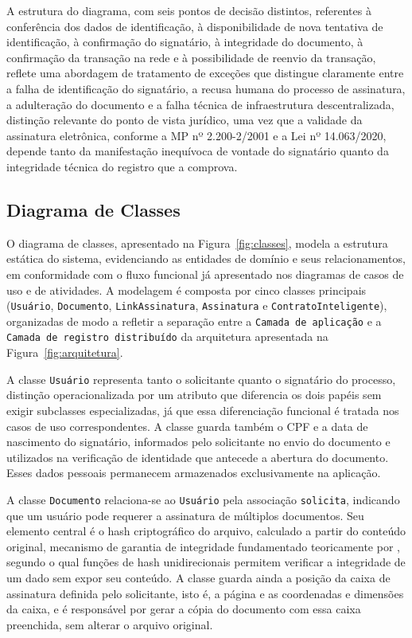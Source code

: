 \documentclass[
    12pt,
    a4paper,
    oneside,
    chapter=TITLE,
    section=TITLE,
    subsection=TITLE,
    subsubsection=TITLE,
    sumario=tradicional,
    english,
    brazil
]{abntex2}
\newcommand{\elem}[1]{\texttt{#1}}
\begin{document}
A estrutura do diagrama, com seis pontos de decisão distintos, referentes à conferência dos dados de identificação, à disponibilidade de nova tentativa de identificação, à confirmação do signatário, à integridade do documento, à confirmação da transação na rede e à possibilidade de reenvio da transação, reflete uma abordagem de tratamento de exceções que distingue claramente entre a falha de identificação do signatário, a recusa humana do processo de assinatura, a adulteração do documento e a falha técnica de infraestrutura descentralizada, distinção relevante do ponto de vista jurídico, uma vez que a validade da assinatura eletrônica, conforme a MP nº 2.200-2/2001 e a Lei nº 14.063/2020, depende tanto da manifestação inequívoca de vontade do signatário quanto da integridade técnica do registro que a comprova.

\subsection{Diagrama de Classes}
\label{sec:classes}

O diagrama de classes, apresentado na Figura~\ref{fig:classes}, modela a estrutura estática do sistema, evidenciando as entidades de domínio e seus relacionamentos, em conformidade com o fluxo funcional já apresentado nos diagramas de casos de uso e de atividades. A modelagem é composta por cinco classes principais (\elem{Usuário}, \elem{Documento}, \elem{LinkAssinatura}, \elem{Assinatura} e \elem{ContratoInteligente}), organizadas de modo a refletir a separação entre a \elem{Camada de aplicação} e a \elem{Camada de registro distribuído} da arquitetura apresentada na Figura~\ref{fig:arquitetura}.

A classe \elem{Usuário} representa tanto o solicitante quanto o signatário do processo, distinção operacionalizada por um atributo que diferencia os dois papéis sem exigir subclasses especializadas, já que essa diferenciação funcional é tratada nos casos de uso correspondentes. A classe guarda também o CPF e a data de nascimento do signatário, informados pelo solicitante no envio do documento e utilizados na verificação de identidade que antecede a abertura do documento. Esses dados pessoais permanecem armazenados exclusivamente na aplicação.

A classe \elem{Documento} relaciona-se ao \elem{Usuário} pela associação \elem{solicita}, indicando que um usuário pode requerer a assinatura de múltiplos documentos. Seu elemento central é o hash criptográfico do arquivo, calculado a partir do conteúdo original, mecanismo de garantia de integridade fundamentado teoricamente por , segundo o qual funções de hash unidirecionais permitem verificar a integridade de um dado sem expor seu conteúdo. A classe guarda ainda a posição da caixa de assinatura definida pelo solicitante, isto é, a página e as coordenadas e dimensões da caixa, e é responsável por gerar a cópia do documento com essa caixa preenchida, sem alterar o arquivo original.
\end{document}
